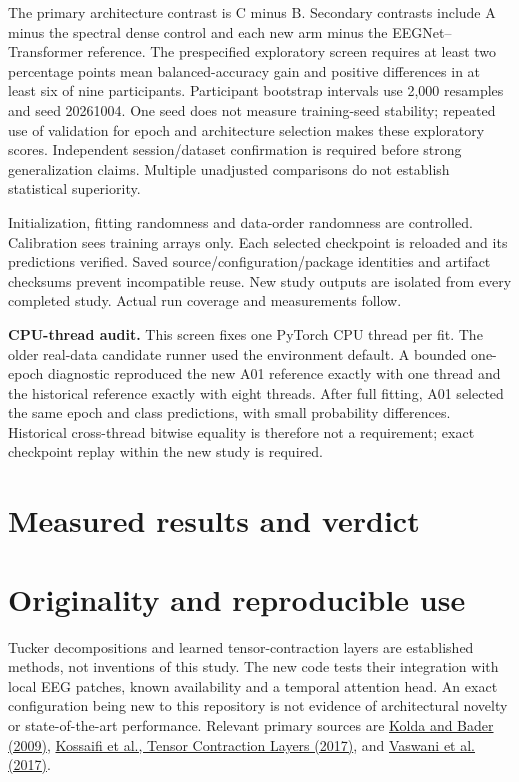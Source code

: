 \documentclass[11pt,a4paper]{article}
\begin{document}
The primary architecture contrast is C minus B. Secondary contrasts include
A minus the spectral dense control and each new arm minus the EEGNet--Transformer
reference. The prespecified exploratory screen requires at least two percentage
points mean balanced-accuracy gain and positive differences in at least six of
nine participants. Participant bootstrap intervals use 2,000 resamples and seed
20261004. One seed does not measure training-seed stability; repeated use of
validation for epoch and architecture selection makes these exploratory scores.
Independent session/dataset confirmation is required before strong generalization
claims. Multiple unadjusted comparisons do not establish statistical superiority.

Initialization, fitting randomness and data-order randomness are controlled.
Calibration sees training arrays only. Each selected checkpoint is reloaded and
its predictions verified. Saved source/configuration/package identities and
artifact checksums prevent incompatible reuse. New study outputs are isolated
from every completed study. Actual run coverage and measurements follow.

\textbf{CPU-thread audit.} This screen fixes one PyTorch CPU thread per fit.
The older real-data candidate runner used the environment default. A bounded
one-epoch diagnostic reproduced the new A01 reference exactly with one thread
and the historical reference exactly with eight threads. After full fitting,
A01 selected the same epoch and class predictions, with small probability
differences. Historical cross-thread bitwise equality is therefore not a
requirement; exact checkpoint replay within the new study is required.

\section{Measured results and verdict}

\section{Originality and reproducible use}
Tucker decompositions and learned tensor-contraction layers are established
methods, not inventions of this study. The new code tests their integration
with local EEG patches, known availability and a temporal attention head.
An exact configuration being new to this repository is not evidence of
architectural novelty or state-of-the-art performance. Relevant primary sources
are \href{https://www.kolda.net/publication/koba09/}{Kolda and Bader (2009)},
\href{https://openaccess.thecvf.com/content_cvpr_2017_workshops/w29/html/Kossaifi_Tensor_Contraction_Layers_CVPR_2017_paper.html}{Kossaifi et al., Tensor Contraction Layers (2017)},
and \href{https://arxiv.org/abs/1706.03762}{Vaswani et al. (2017)}.
\end{document}

